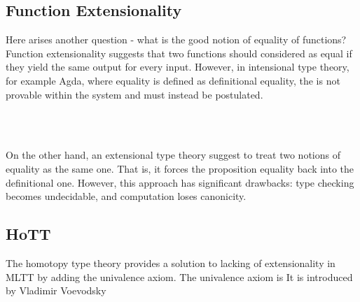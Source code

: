 \subsection*{Function Extensionality}

Here arises another question - what is the good notion of equality of functions? Function extensionality suggests that two functions should considered as equal if they yield the same output for every input. However, in intensional type theory, for example Agda, where equality is defined as definitional equality, the  is not provable within the system and must instead be postulated.

\begin{code}%
\>[0]\<%
\\
\>[0][@{}l@{\AgdaIndent{0}}]%
\>[2]\AgdaSpace{}%
\AgdaSymbol{:}%
\>[191I]\AgdaSymbol{\{}\AgdaSpace{}%
\AgdaSymbol{:}\AgdaSpace{}%
\AgdaSymbol{\}}\AgdaSpace{}%
\AgdaSymbol{\{}\AgdaSpace{}%
\AgdaSymbol{:}\AgdaSpace{}%
\AgdaSpace{}%
\AgdaSpace{}%
\AgdaSymbol{\}}\AgdaSpace{}%
\AgdaSymbol{\{}\AgdaSpace{}%
\AgdaSpace{}%
\AgdaSymbol{:}\AgdaSpace{}%
\AgdaSymbol{(}\AgdaSpace{}%
\AgdaSymbol{:}\AgdaSpace{}%
\AgdaSymbol{)}\AgdaSpace{}%
\AgdaSpace{}%
\AgdaSpace{}%
\AgdaSymbol{\}}\AgdaSpace{}%
\<%
\\
\>[.][@{}l@{}]\<[191I]%
\>[11]\AgdaSymbol{((}\AgdaSpace{}%
\AgdaSymbol{:}\AgdaSpace{}%
\AgdaSymbol{)}\AgdaSpace{}%
\AgdaSpace{}%
\AgdaSpace{}%
\AgdaSpace{}%
\AgdaSpace{}%
\AgdaSpace{}%
\AgdaSymbol{)}\AgdaSpace{}%
\AgdaSpace{}%
\AgdaSpace{}%
\AgdaSpace{}%
\<%
\end{code}

On the other hand, an extensional type theory suggest to treat two notions of equality as the same one. That is, it forces the proposition equality back into the definitional one. However, this approach has significant drawbacks: type checking becomes undecidable, and computation loses canonicity.

\subsection*{HoTT}

The homotopy type theory provides a solution to lacking of extensionality in MLTT by adding the univalence axiom. The univalence axiom is It is introduced by Vladimir Voevodsky
